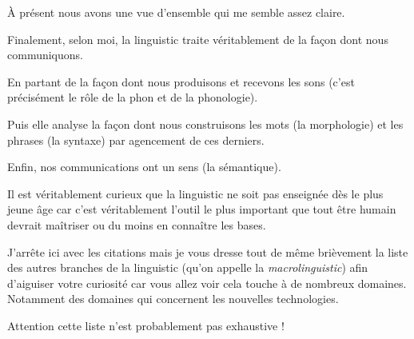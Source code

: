 \begin{center}
\begin{mdframed}[style=tradstyle, frametitle={\exFR{Traduction} de l'extrait précédent}]
\end{mdframed}  
\end{center}


À présent nous avons une vue d'ensemble qui me semble assez
claire.

Finalement, selon moi, la \gls{linguistic} traite véritablement de
la façon dont nous communiquons.

En partant de la façon dont nous produisons et recevons les sons
(c'est précisément le rôle de la \gls{phon} et de la phonologie).

Puis elle analyse la façon dont nous construisons les mots (la
morphologie) et les phrases (la syntaxe) par agencement de ces
derniers.

Enfin, nos communications ont un sens (la sémantique).

Il est véritablement curieux que la \gls{linguistic} ne soit pas enseignée
dès le plus jeune âge car c'est véritablement l'outil le plus
important que tout être humain devrait maîtriser ou du moins en connaître les bases.

J'arrête ici avec les citations mais je vous dresse tout de même
brièvement la liste des autres branches de la \gls{linguistic} (qu'on
appelle la \emph{macro\gls{linguistic}}) afin d'aiguiser votre curiosité
car vous allez voir cela touche à de nombreux domaines. Notamment des
domaines qui concernent les nouvelles technologies.

Attention cette liste n'est probablement pas exhaustive !

